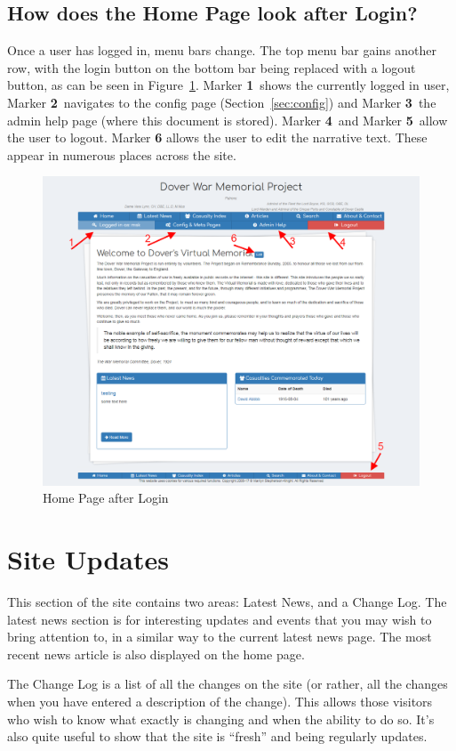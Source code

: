 \documentclass[12pt]{article}
\newcommand{\marker}[1]{Marker \color{red}\textbf{#1}\color{black}}
\begin{document}
\newpage
\FloatBarrier
\subsection{How does the Home Page look after Login?}
Once a user has logged in, menu bars change. The top menu bar gains another row, with the login button on the bottom bar being replaced with a logout button, as can be seen in Figure~\ref{fig:home_login}. \marker{1}\ shows the currently logged in user, \marker{2}\ navigates to the config page (Section~\ref{sec:config}) and \marker{3}\ the admin help page (where this document is stored). \marker{4}\ and \marker{5}\ allow the user to logout. \marker{6} allows the user to edit the narrative text. These appear in numerous places across the site.

\begin{figure}[h]
  \centering
 \includegraphics[width=.9\textwidth]{pics/home_login.png}
	\caption{Home Page after Login}\label{fig:home_login}
\end{figure}

\newpage
\FloatBarrier
\section{Site Updates}\label{sec:siteUpdate}
This section of the site contains two areas: Latest News, and a Change Log. The latest news section is for interesting updates and events that you may wish to bring attention to, in a similar way to the current latest news page. The most recent news article is also displayed on the home page.

The Change Log is a list of all the changes on the site (or rather, all the changes when you have entered a description of the change). This allows those visitors who wish to know what exactly is changing and when the ability to do so. It's also quite useful to show that the site is ``fresh'' and being regularly updates.
\end{document}
